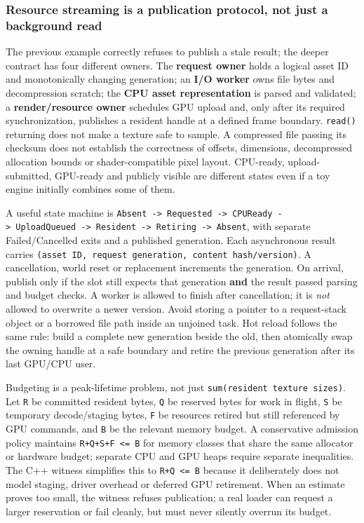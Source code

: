 \subsubsection{Resource streaming is a publication protocol, not just a background read}\label{06-engine-ii-ch027-resource-streaming-is-a-publication-protocol-not-just-a-background-read}

The previous example correctly refuses to publish a stale result; the deeper contract has four different owners. The \textbf{request owner} holds a logical asset ID and monotonically changing generation; an \textbf{I/O worker} owns file bytes and decompression scratch; the \textbf{CPU asset representation} is parsed and validated; a \textbf{render/resource owner} schedules GPU upload and, only after its required synchronization, publishes a resident handle at a defined frame boundary. \texttt{read()} returning does not make a texture safe to sample. A compressed file passing its checksum does not establish the correctness of offsets, dimensions, decompressed allocation bounds or shader-compatible pixel layout. CPU-ready, upload-submitted, GPU-ready and publicly visible are different states even if a toy engine initially combines some of them.

A useful state machine is \texttt{Absent\ -\textgreater{}\ Requested\ -\textgreater{}\ CPUReady\ -\textgreater{}\ UploadQueued\ -\textgreater{}\ Resident\ -\textgreater{}\ Retiring\ -\textgreater{}\ Absent}, with separate Failed/Cancelled exits and a published generation. Each asynchronous result carries \texttt{(asset\ ID,\ request\ generation,\ content\ hash/version)}. A cancellation, world reset or replacement increments the generation. On arrival, publish only if the slot still expects that generation \textbf{and} the result passed parsing and budget checks. A worker is allowed to finish after cancellation; it is \emph{not} allowed to overwrite a newer version. Avoid storing a pointer to a request-stack object or a borrowed file path inside an unjoined task. Hot reload follows the same rule: build a complete new generation beside the old, then atomically swap the owning handle at a safe boundary and retire the previous generation after its last GPU/CPU user.

Budgeting is a peak-lifetime problem, not just \texttt{sum(resident\ texture\ sizes)}. Let \texttt{R} be committed resident bytes, \texttt{Q} be reserved bytes for work in flight, \texttt{S} be temporary decode/staging bytes, \texttt{F} be resources retired but still referenced by GPU commands, and \texttt{B} be the relevant memory budget. A conservative admission policy maintains \texttt{R+Q+S+F\ \textless{}=\ B} for memory classes that share the same allocator or hardware budget; separate CPU and GPU heaps require separate inequalities. The C++ witness simplifies this to \texttt{R+Q\ \textless{}=\ B} because it deliberately does not model staging, driver overhead or deferred GPU retirement. When an estimate proves too small, the witness refuses publication; a real loader can request a larger reservation or fail cleanly, but must never silently overrun its budget.

